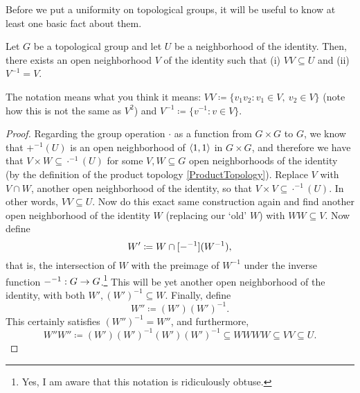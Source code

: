 Before we put a uniformity on topological groups, it will be useful to know at least one basic fact about them.
\begin{prp}\label{prp4.8.59}
\begin{savenotes}
Let $G$ be a topological group and let $U$ be a neighborhood of the identity.  Then, there exists an open neighborhood $V$ of the identity such that (i) $VV\subseteq U$ and (ii) $V^{-1}=V$.
\begin{rmk}
The notation means what you think it means:  $VV\coloneqq \{ v_1v_2:v_1\in V,\ v_2\in V\}$ (note how this is not the same as $V^2$) and $V^{-1}\coloneqq \{ v^{-1}:v\in V\}$.
\end{rmk}
\begin{proof}
Regarding the group operation $\cdot$ as a function from $G\times G$ to $G$, we know that $+^{-1}(U)$ is an open neighborhood of $\langle1,1\rangle$ in $G\times G$, and therefore we have that $V\times W\subseteq \cdot ^{-1}(U)$ for some $V,W\subseteq G$ open neighborhoods of the identity (by the definition of the product topology \cref{ProductTopology}).   Replace $V$ with $V\cap W$, another open neighborhood of the identity, so that $V\times V\subseteq \cdot ^{-1}(U)$.  In other words, $VV\subseteq U$.  Now do this exact same construction again and find another open neighborhood of the identity $W$ (replacing our `old' $W$) with $WW\subseteq V$.  Now define
\begin{equation}
W'\coloneqq W\cap [{-} ^{-1}](W^{-1}),
\end{equation}
that is, the intersection of $W$ with the preimage of $W^{-1}$ under the inverse function ${-} ^{-1}:G\rightarrow G$.\footnote{Yes, I am aware that this notation is ridiculously obtuse.}  This will be yet another open neighborhood of the identity, with both $W',(W')^{-1}\subseteq W$.  Finally, define
\begin{equation}
W''\coloneqq (W')(W')^{-1}.
\end{equation}
This certainly satisfies $(W'')^{-1}=W''$, and furthermore,
\begin{equation}
W''W''\coloneqq (W')(W')^{-1}(W')(W')^{-1}\subseteq WWWW\subseteq VV\subseteq U.
\end{equation}
\end{proof}
\end{savenotes}
\end{prp}

